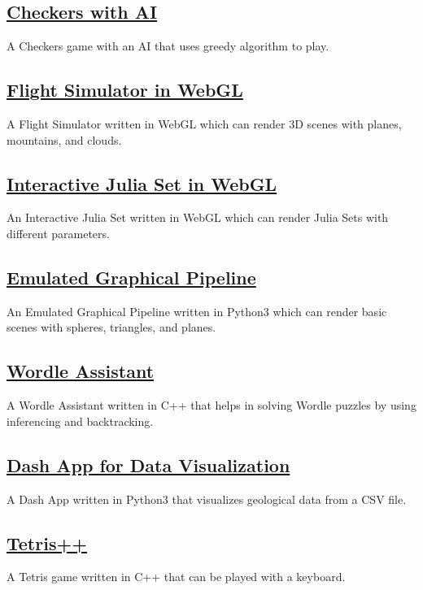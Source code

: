 \documentclass[]{resume}
\begin{document}
\begin{minipage}[t]{0.5\textwidth}
    \subsection{\href{https://github.com/Qazalbash/Checkers-with-AI}{\textbf{Checkers with AI}}}%
    A Checkers game with an AI that uses greedy algorithm to play.

    \subsection{\href{https://github.com/Qazalbash/Flight-Simulator-in-WebGL}{\textbf{Flight Simulator in WebGL}}}
    A Flight Simulator written in WebGL which can render 3D scenes with planes, mountains, and clouds.

    \subsection{\href{https://github.com/Qazalbash/Interactive-Julia-Set}{\textbf{Interactive Julia Set in WebGL}}}
    An Interactive Julia Set written in WebGL which can render Julia Sets with different parameters.

    \subsection{\href{https://github.com/Qazalbash/Emulated-Graphical-Pipeline}{
            \textbf{Emulated Graphical Pipeline}}}%
    An Emulated Graphical Pipeline written in Python3 which can render basic scenes with spheres, triangles, and planes.

    \subsection{\href{https://github.com/Qazalbash/Wordle-Assistant}{\textbf{Wordle Assistant}}}%
    A Wordle Assistant written in C++ that helps in solving Wordle puzzles by using inferencing and backtracking.

    \subsection{\href{https://github.com/Qazalbash/Dash-App-for-Data-Visualization}{
            \textbf{Dash App for Data Visualization}}}%
    A Dash App written in Python3 that visualizes geological data from a CSV file.

    \subsection{\href{https://github.com/Qazalbash/Tetris-Plus-Plus}{\textbf{Tetris++}}}%
    A Tetris game written in C++ that can be played with a keyboard.


\end{minipage}
\end{document}
